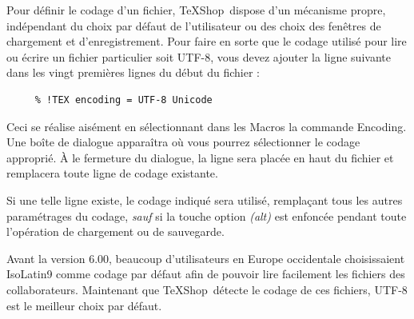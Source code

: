 \documentclass[11pt,french]{article}
\newcommand{\TS}{\textsf{\TeX Shop}}
\newcommand{\acr}[1]{\textsf{#1}}
\newcommand{\cmd}[1]{\textsf{#1}}
\begin{document}
Pour définir le codage d'un fichier, \TS\ dispose d'un mécanisme propre, indépendant du choix par défaut de l'utilisateur ou des choix des fenêtres de chargement et d'enregistrement. Pour faire en sorte que le codage utilisé pour lire ou écrire un fichier particulier soit \acr{UTF-8}, vous devez ajouter la ligne suivante dans les vingt premières lignes du début du fichier :
\begin{verbatim}
     % !TEX encoding = UTF-8 Unicode
\end{verbatim}

Ceci se réalise aisément en sélectionnant dans les \cmd{Macros} la commande \cmd{Encoding}. Une boîte de dialogue apparaîtra où vous pourrez sélectionner le codage approprié. À le fermeture du dialogue, la ligne sera placée en haut du fichier et remplacera toute ligne de codage existante.

Si une telle ligne existe, le codage indiqué sera utilisé, remplaçant tous les autres paramétrages du codage, \emph{sauf} si la touche option \emph{(alt)} est enfoncée pendant toute l'opération de chargement ou de sauvegarde.

Avant la version 6.00, beaucoup d'utilisateurs en Europe occidentale choisissaient \acr{IsoLatin9} comme codage par défaut afin de pouvoir lire facilement les fichiers des collaborateurs. Maintenant que \TS\ détecte le codage de ces fichiers, \acr{UTF-8} est le meilleur choix par défaut.
\end{document}
